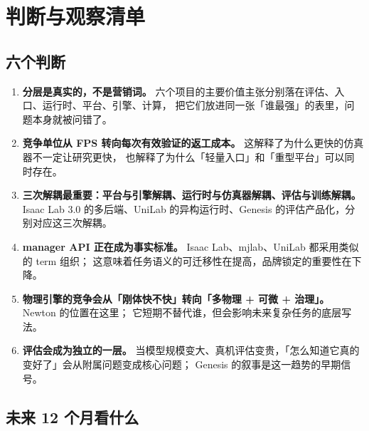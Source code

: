 \documentclass[UTF8, 11pt, a4paper, fontset=windows]{ctexart}
\begin{document}
\section{判断与观察清单}\label{sec:outlook}

\subsection{六个判断}

\begin{enumerate}
  \item \textbf{分层是真实的，不是营销词。} 六个项目的主要价值主张分别落在评估、入口、运行时、平台、引擎、计算，
        把它们放进同一张「谁最强」的表里，问题本身就被问错了。
  \item \textbf{竞争单位从 FPS 转向每次有效验证的返工成本。} 这解释了为什么更快的仿真器不一定让研究更快，
        也解释了为什么「轻量入口」和「重型平台」可以同时存在。
  \item \textbf{三次解耦最重要：平台与引擎解耦、运行时与仿真器解耦、评估与训练解耦。}
        Isaac Lab 3.0 的多后端、UniLab 的异构运行时、Genesis 的评估产品化，分别对应这三次解耦。
  \item \textbf{manager API 正在成为事实标准。} Isaac Lab、mjlab、UniLab 都采用类似的 term 组织；
        这意味着任务语义的可迁移性在提高，品牌锁定的重要性在下降。
  \item \textbf{物理引擎的竞争会从「刚体快不快」转向「多物理 + 可微 + 治理」。} Newton 的位置在这里；
        它短期不替代谁，但会影响未来复杂任务的底层写法。
  \item \textbf{评估会成为独立的一层。} 当模型规模变大、真机评估变贵，「怎么知道它真的变好了」会从附属问题变成核心问题；
        Genesis 的叙事是这一趋势的早期信号。
\end{enumerate}

\subsection{未来 12 个月看什么}
\end{document}
